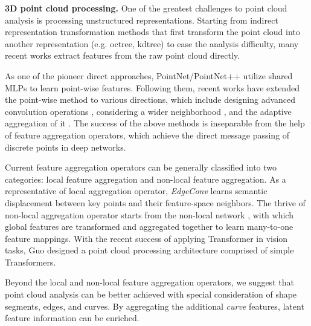\documentclass[10pt,twocolumn,letterpaper]{article}
\theoremstyle{definition}
\begin{document}
\noindent
\textbf{3D point cloud processing.} One of the greatest challenges to point cloud analysis is processing unstructured representations. Starting from indirect representation transformation methods \cite{li2016fpnn, klokov2017escape, riegler2017octnet, lei2019octree} that first transform the point cloud into another representation (e.g. octree, kdtree) to ease the analysis difficulty, many recent works \cite{qi2017pointnet,zhang2020shape,hu2020randla} extract features from the raw point cloud directly.





As one of the pioneer direct approaches, PointNet/PointNet++ \cite{qi2017pointnet, qi2017pointnet++} utilize shared MLPs to learn point-wise features. Following them, recent works have extended the point-wise method to various directions, which include designing advanced convolution operations \cite{komarichev2019cnn, xu2020grid, wu2019pointconv, liu2019relation}, considering a wider neighborhood \cite{li2018so, zhao2019pointweb, wang2019dynamic, liu2019lpd}, and the adaptive aggregation of it \cite{hu2020randla, yan2020pointasnl, zhang2019pcan, yang2019modeling}. The success of the above methods is inseparable from the help of feature aggregation operators, which achieve the direct message passing of discrete points in deep networks.

Current feature aggregation operators can be generally classified into two categories: local feature aggregation and non-local feature aggregation. As a representative of local aggregation operator, \textit{EdgeConv} \cite{wang2019dynamic} learns semantic displacement between key points and their feature-space neighbors. The thrive of non-local aggregation operator starts from the non-local network \cite{wang2018non}, with which global features are transformed and aggregated together to learn many-to-one feature mappings. With the recent success of applying Transformer \cite{vaswani2017attention} in vision tasks, Guo \etal \cite{guo2020pct} designed a point cloud processing architecture comprised of simple Transformers. 









Beyond the local and non-local feature aggregation operators, we suggest that point cloud analysis can be better achieved with special consideration of shape segments, edges, and curves. By aggregating the additional \textit{curve} features, latent feature information can be enriched. 
\end{document}
